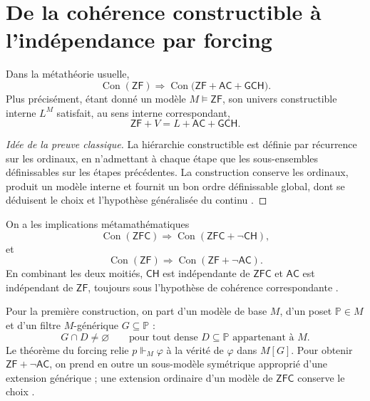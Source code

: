 \label{chap:p3-83-47-godel_cohen}

\section{De la cohérence constructible à l'indépendance par forcing}

\begin{theorem}
Dans la métathéorie usuelle,
\[
  \operatorname{Con}(\mathsf{ZF})
  \Longrightarrow
  \operatorname{Con}
  \bigl(\mathsf{ZF}+\mathsf{AC}+\mathsf{GCH}\bigr).
\]
Plus précisément, étant donné un modèle \(M\models\mathsf{ZF}\), son univers
constructible interne \(L^M\) satisfait, au sens interne correspondant,
\[
  \mathsf{ZF}+V=L+\mathsf{AC}+\mathsf{GCH}.
\]
\end{theorem}

\begin{proof}[Idée de la preuve classique]
La hiérarchie constructible est définie par récurrence sur les ordinaux,
en n'admettant à chaque étape que les sous-ensembles définissables sur les étapes
précédentes. La construction conserve les ordinaux, produit un modèle interne
et fournit un bon ordre définissable global, dont se déduisent le choix et
l'hypothèse généralisée du continu \citep{goedel1940}.
\end{proof}

\begin{theorem}
On a les implications métamathématiques
\[
  \operatorname{Con}(\mathsf{ZFC})
  \Longrightarrow
  \operatorname{Con}(\mathsf{ZFC}+\neg\mathsf{CH}),
\]
et
\[
  \operatorname{Con}(\mathsf{ZF})
  \Longrightarrow
  \operatorname{Con}(\mathsf{ZF}+\neg\mathsf{AC}).
\]
En combinant les deux moitiés, \(\mathsf{CH}\) est indépendante de
\(\mathsf{ZFC}\) et \(\mathsf{AC}\) est indépendant de \(\mathsf{ZF}\),
toujours sous l'hypothèse de cohérence correspondante
\citep{cohen1963,cohen1964}.
\end{theorem}

Pour la première construction, on part d'un modèle de base \(M\), d'un poset
\(\mathbb P\in M\) et d'un filtre \(M\)-générique \(G\subseteq\mathbb P\) :
\[
  G\cap D\ne\varnothing
  \qquad
  \text{pour tout dense }D\subseteq\mathbb P\text{ appartenant à }M.
\]
Le théorème du forcing relie \(p\Vdash_M\varphi\) à la vérité de
\(\varphi\) dans \(M[G]\). Pour obtenir
\(\mathsf{ZF}+\neg\mathsf{AC}\), on prend en outre un sous-modèle symétrique
approprié d'une extension générique ; une extension ordinaire d'un modèle de
\(\mathsf{ZFC}\) conserve le choix \citep{cohen1966}.

